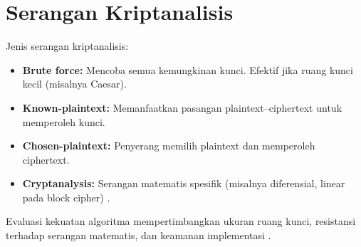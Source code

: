 \section{Serangan Kriptanalisis}

Jenis serangan kriptanalisis:
\begin{itemize}
\item \textbf{Brute force:} Mencoba semua kemungkinan kunci. Efektif jika ruang kunci kecil (misalnya Caesar).
\item \textbf{Known-plaintext:} Memanfaatkan pasangan plaintext--ciphertext untuk memperoleh kunci.
\item \textbf{Chosen-plaintext:} Penyerang memilih plaintext dan memperoleh ciphertext.
\item \textbf{Cryptanalysis:} Serangan matematis spesifik (misalnya diferensial, linear pada block cipher) \cite{menezes1996,schneier1996}.
\end{itemize}

Evaluasi kekuatan algoritma mempertimbangkan ukuran ruang kunci, resistansi terhadap serangan matematis, dan keamanan implementasi \cite{menezes1996,schneier1996}.
